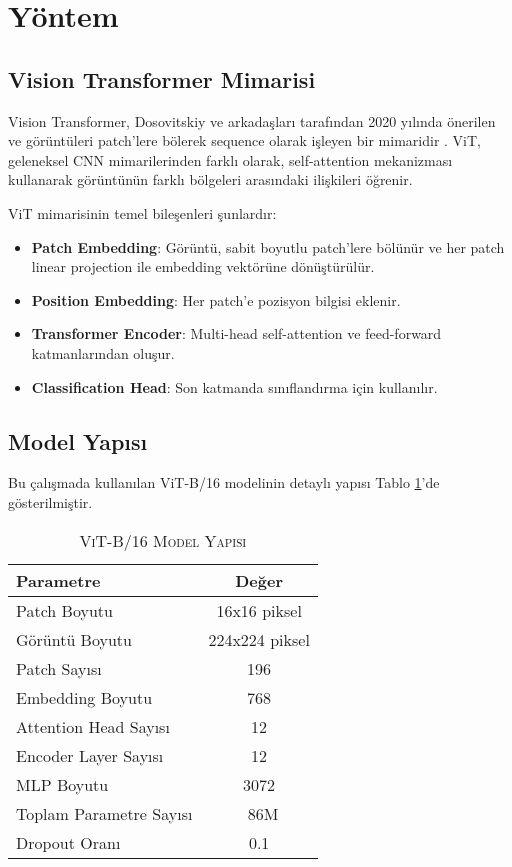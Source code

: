 \documentclass[conference, a4paper]{IEEEtran}
\begin{document}
	\section{Yöntem}
	
	\subsection{Vision Transformer Mimarisi}
	
	Vision Transformer, Dosovitskiy ve arkadaşları tarafından 2020 yılında önerilen ve görüntüleri patch'lere bölerek sequence olarak işleyen bir mimaridir \cite{dosovitskiy2020image}. ViT, geleneksel \ac{CNN} mimarilerinden farklı olarak, self-attention mekanizması kullanarak görüntünün farklı bölgeleri arasındaki ilişkileri öğrenir.
	
	ViT mimarisinin temel bileşenleri şunlardır:
	
	\begin{itemize}
		\item \textbf{Patch Embedding}: Görüntü, sabit boyutlu patch'lere bölünür ve her patch linear projection ile embedding vektörüne dönüştürülür.
		\item \textbf{Position Embedding}: Her patch'e pozisyon bilgisi eklenir.
		\item \textbf{Transformer Encoder}: Multi-head self-attention ve feed-forward katmanlarından oluşur.
		\item \textbf{Classification Head}: Son katmanda sınıflandırma için kullanılır.
	\end{itemize}
	
	\subsection{Model Yapısı}
	
	Bu çalışmada kullanılan ViT-B/16 modelinin detaylı yapısı Tablo \ref{tablo_model}'de gösterilmiştir.
	
	\begin{table}[h]
		\centering
		\caption{\textsc{ViT-B/16 Model Yapısı}}
		\label{tablo_model}
		\begin{tabular}{|l|c|}
			\hline
			\textbf{Parametre} & \textbf{Değer} \\
			\hline
			Patch Boyutu & 16x16 piksel \\
			\hline
			Görüntü Boyutu & 224x224 piksel \\
			\hline
			Patch Sayısı & 196 \\
			\hline
			Embedding Boyutu & 768 \\
			\hline
			Attention Head Sayısı & 12 \\
			\hline
			Encoder Layer Sayısı & 12 \\
			\hline
			MLP Boyutu & 3072 \\
			\hline
			Toplam Parametre Sayısı & ~86M \\
			\hline
			Dropout Oranı & 0.1 \\
			\hline
		\end{tabular}
	\end{table}
	
\end{document}
